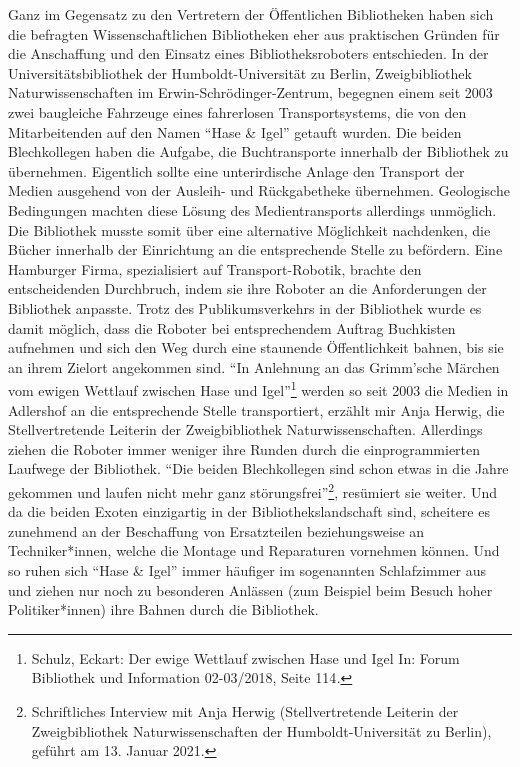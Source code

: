 \documentclass[a4paper,
fontsize=11pt,
oneside,
numbers=noperiodatend,
parskip=half-,
bibliography=totoc,
final
]{scrartcl}
\begin{document}
Ganz im Gegensatz zu den Vertretern der Öffentlichen Bibliotheken haben
sich die befragten Wissenschaftlichen Bibliotheken eher aus praktischen
Gründen für die Anschaffung und den Einsatz eines Bibliotheksroboters
entschieden. In der Universitätsbibliothek der Humboldt-Universität zu
Berlin, Zweigbibliothek Naturwissenschaften im
Erwin-Schrödinger-Zentrum, begegnen einem seit 2003 zwei baugleiche
Fahrzeuge eines fahrerlosen Transportsystems, die von den Mitarbeitenden
auf den Namen \enquote{Hase \& Igel} getauft wurden. Die beiden
Blechkollegen haben die Aufgabe, die Buchtransporte innerhalb der
Bibliothek zu übernehmen. Eigentlich sollte eine unterirdische Anlage
den Transport der Medien ausgehend von der Ausleih- und Rückgabetheke
übernehmen. Geologische Bedingungen machten diese Lösung des
Medientransports allerdings unmöglich. Die Bibliothek musste somit über
eine alternative Möglichkeit nachdenken, die Bücher innerhalb der
Einrichtung an die entsprechende Stelle zu befördern. Eine Hamburger
Firma, spezialisiert auf Transport-Robotik, brachte den entscheidenden
Durchbruch, indem sie ihre Roboter an die Anforderungen der Bibliothek
anpasste. Trotz des Publikumsverkehrs in der Bibliothek wurde es damit
möglich, dass die Roboter bei entsprechendem Auftrag Buchkisten
aufnehmen und sich den Weg durch eine staunende Öffentlichkeit bahnen,
bis sie an ihrem Zielort angekommen sind. \enquote{In Anlehnung an das
Grimm'sche Märchen vom ewigen Wettlauf zwischen Hase und
Igel}\footnote{Schulz, Eckart: Der ewige Wettlauf zwischen Hase und Igel
  In: Forum Bibliothek und Information 02-03/2018, Seite 114\emph{.}}
werden so seit 2003 die Medien in Adlershof an die entsprechende Stelle
transportiert, erzählt mir Anja Herwig, die Stellvertretende Leiterin
der Zweigbibliothek Naturwissenschaften. Allerdings ziehen die Roboter
immer weniger ihre Runden durch die einprogrammierten Laufwege der
Bibliothek. \enquote{Die beiden Blechkollegen sind schon etwas in die
Jahre gekommen und laufen nicht mehr ganz störungsfrei}\footnote{Schriftliches
  Interview mit Anja Herwig (Stellvertretende Leiterin der
  Zweigbibliothek Naturwissenschaften der Humboldt-Universität zu
  Berlin), geführt am 13. Januar 2021.}, resümiert sie weiter. Und da
die beiden Exoten einzigartig in der Bibliothekslandschaft sind,
scheitere es zunehmend an der Beschaffung von Ersatzteilen
beziehungsweise an Techniker*innen, welche die Montage und Reparaturen
vornehmen können. Und so ruhen sich \enquote{Hase \& Igel} immer
häufiger im sogenannten Schlafzimmer aus und ziehen nur noch zu
besonderen Anlässen (zum Beispiel beim Besuch hoher Politiker*innen)
ihre Bahnen durch die Bibliothek.
\end{document}
